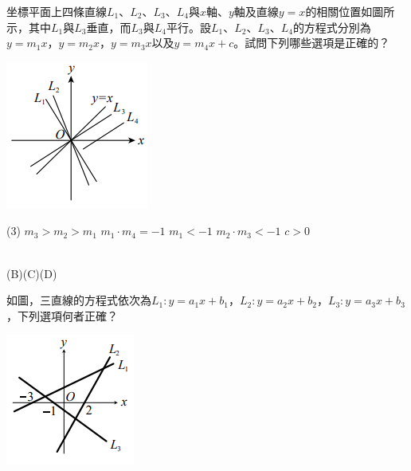 \documentclass
[answers]
{exam}
\theoremstyle{definition}
\begin{document}
\begin{questions}
\question

\begin{minipage}[t]{0.7\linewidth}
	坐標平面上四條直線$L_1$、$L_2$、$L_3$、$L_4$與$x$軸、$y$軸及直線$y=x$的相關位置如圖所示，其中$L_1$與$L_3$垂直，而$L_3$與$L_4$平行。設$L_1$、$L_2$、$L_3$、$L_4$的方程式分別為$y=m_1x$，$y=m_2x$，$y=m_3x$以及$y=m_4x+c$。試問下列哪些選項是正確的？
\end{minipage}
\hfill
\begin{minipage}[t]{0.3\linewidth}
	\vspace*{-0.3cm}
	\includegraphics[scale=1]{./chapter_3/figure/11.png}
	\raggedleft %
\end{minipage}


\begin{tasks}(3)
	\tasks $m_3 > m_2 > m_1$
	\tasks $m_1 \cdot m_4 = -1$
	\tasks $m_1 < -1$
	\tasks $m_2 \cdot m_3 < -1$
	\tasks $c > 0$
\end{tasks}
\begin{solution}~\\
	(B)(C)(D)
\end{solution}

\question

\begin{minipage}[t]{0.7\linewidth}
	如圖，三直線的方程式依次為$L_1:y=a_1x+b_1$，$L_2:y=a_2x+b_2$，$L_3:y=a_3x+b_3$，下列選項何者正確？
\end{minipage}
\hfill
\begin{minipage}[t]{0.3\linewidth}
	\vspace*{-0.3cm}
	\includegraphics[scale=1]{./chapter_3/figure/12.png}
	\raggedleft %
\end{minipage}



\end{questions}
\end{document}
